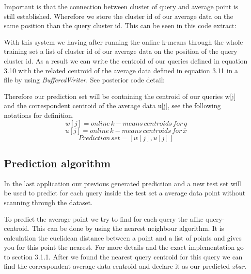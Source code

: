 \documentclass{lmproj}
\begin{document}


Important is that the connection between cluster of query and average point is still established. Wherefore we store the cluster id of our average data on the same position than the query cluster id. This can be seen in this code extract:


With this system we having after running the online k-means through the whole training set a list of cluster id of our average data on the position of the query cluster id. As a result we can write the centroid of our queries defined in equation 3.10 with the related centroid of the average data defined in equation 3.11 in a file by using \textit{BufferedWriter}. See posterior code detail:


Therefore our prediction set will be containing the centroid of our queries w[j] and the correspondent centroid of the average data u[j], see the following notations for definition.
\begin{equation}
w[j]= online\,k-means\,centroids\,for\,q
\end{equation}
\begin{equation}
u[j]= online\,k-means\,centroids\,for\,\bar{x}
\end{equation}
\begin{equation}
Prediction\,set=[w[j],u[j]]
\end{equation}

\subsection{Prediction algorithm}

In the last application our previous generated prediction and a new test set will be used to predict for each query inside the test set a average data point without scanning through the dataset.

To predict the average point we try to find for each query the alike query-centroid. This can be done by using the nearest neighbour algorithm. It is calculation the euclidean distance between a point and a list of points and gives you for this point the nearest. For more details and the exact implementation go to section 3.1.1. After we found the nearest query centroid for this query we can find the correspondent average data centroid and declare it as our predicted \textit{xbar}.  
\end{document}
